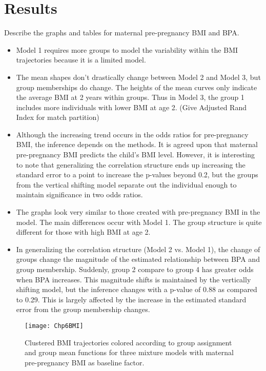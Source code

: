 \section{Results}
Describe the graphs and tables for maternal pre-pregnancy BMI and BPA.
\begin{itemize}
\item Model 1 requires more groups to model the variability within the BMI trajectories because it is a limited model. 
\item The mean shapes don't drastically change between Model 2 and Model 3, but group memberships do change. The heights of the mean curves only indicate the average BMI at 2 years within groups. Thus in Model 3, the group 1 includes more individuals with lower BMI at age 2. (Give Adjusted Rand Index for match partition)
\item Although the increasing trend occurs in the odds ratios for pre-pregnancy BMI, the inference depends on the methods. It is agreed upon that maternal pre-pregnancy BMI predicts the child's BMI level. However, it is interesting to note that generalizing the correlation structure ends up increasing the standard error to a point to increase the p-values beyond 0.2, but the groups from the vertical shifting model separate out the individual enough to maintain significance in two odds ratios. 
\item The graphs look very similar to those created with pre-pregnancy BMI in the model. The main differences occur with Model 1. The group structure is quite different for those with high BMI at age 2. 
\item In generalizing the correlation structure (Model 2 vs. Model 1), the change of groups change the magnitude of the estimated relationship between BPA and group membership. Suddenly, group 2 compare to group 4 has greater odds when BPA increases. This magnitude shifts is maintained by the vertically shifting model, but the inference changes with a p-value of 0.88 as compared to 0.29. This is largely affected by the increase in the estimated standard error from the group membership changes.
\end{itemize} 
\begin{figure}[h]
\begin{center}
\texttt{[image: Chp6BMI]}
\end{center}
\label{fig:dataresults}
\caption{Clustered BMI trajectories colored according to group assignment and group mean functions for three mixture models with maternal pre-pregnancy BMI as baseline factor.}
\end{figure}
